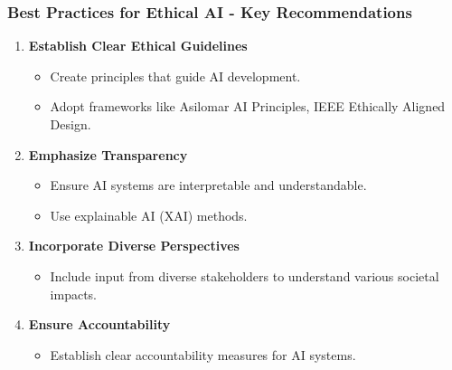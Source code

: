 \documentclass[aspectratio=169]{beamer}
\begin{document}
\begin{frame}[fragile]
    \frametitle{Best Practices for Ethical AI - Key Recommendations}
    \begin{enumerate}
        \item \textbf{Establish Clear Ethical Guidelines}
            \begin{itemize}
                \item Create principles that guide AI development.
                \item Adopt frameworks like Asilomar AI Principles, IEEE Ethically Aligned Design.
            \end{itemize}

        \item \textbf{Emphasize Transparency}
            \begin{itemize}
                \item Ensure AI systems are interpretable and understandable.
                \item Use explainable AI (XAI) methods.
            \end{itemize}

        \item \textbf{Incorporate Diverse Perspectives}
            \begin{itemize}
                \item Include input from diverse stakeholders to understand various societal impacts.
            \end{itemize}

        \item \textbf{Ensure Accountability}
            \begin{itemize}
                \item Establish clear accountability measures for AI systems.
            \end{itemize}
    \end{enumerate}
\end{frame}
\end{document}
